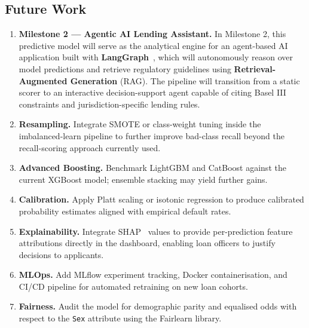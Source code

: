 \documentclass[12pt,a4paper]{article}
\theoremstyle{definition}
\newcommand{\code}[1]{\texttt{#1}}
\begin{document}
\subsection{Future Work}

\begin{enumerate}
  \item \textbf{Milestone 2 — Agentic AI Lending Assistant.}
        In Milestone 2, this predictive model will serve as the analytical
        engine for an agent-based AI application built with
        \textbf{LangGraph}~\cite{langgraph2024}, which will autonomously reason
        over model predictions and retrieve regulatory guidelines using
        \textbf{Retrieval-Augmented Generation} (RAG).  The pipeline will
        transition from a static scorer to an interactive decision-support
        agent capable of citing Basel III constraints and jurisdiction-specific
        lending rules.
  \item \textbf{Resampling.}  Integrate SMOTE or class-weight tuning inside
        the imbalanced-learn pipeline to further improve bad-class recall beyond
        the recall-scoring approach currently used.
  \item \textbf{Advanced Boosting.}  Benchmark LightGBM and CatBoost against
        the current XGBoost model; ensemble stacking may yield further gains.
  \item \textbf{Calibration.}  Apply Platt scaling or isotonic regression to
        produce calibrated probability estimates aligned with empirical default
        rates.
  \item \textbf{Explainability.}  Integrate SHAP~\cite{lundberg2017} values to
        provide per-prediction feature attributions directly in the dashboard,
        enabling loan officers to justify decisions to applicants.
  \item \textbf{MLOps.}  Add MLflow experiment tracking, Docker containerisation,
        and CI/CD pipeline for automated retraining on new loan cohorts.
  \item \textbf{Fairness.}  Audit the model for demographic parity and equalised
        odds with respect to the \code{Sex} attribute using the Fairlearn
        library.
\end{enumerate}

\newpage
\end{document}
